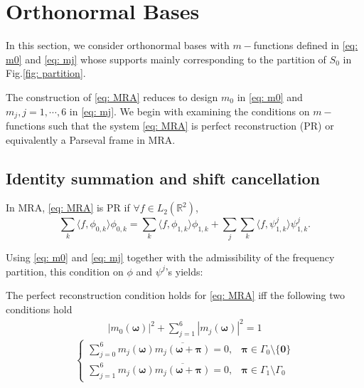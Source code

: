 \section{Orthonormal Bases}\label{sec: orth}

In this section, we consider orthonormal bases with $m-$functions defined in \eqref{eq: m0} and \eqref{eq: mj} whose supports mainly corresponding to the partition of $S_0$ in Fig.\ref{fig: partition}.

The construction of \eqref{eq: MRA} reduces to design $m_0$ in \eqref{eq: m0} and $m_j, j= 1,\cdots,6$ in \eqref{eq: mj}.
We begin with examining the conditions on $m-$functions such that the system \eqref{eq: MRA} is perfect reconstruction (PR) or equivalently a Parseval frame in MRA.%

\subsection{Identity summation and shift cancellation}

In MRA, \eqref{eq: MRA} is PR if $\forall f\in L_2(\mathbb{R}^2)$,
\begin{equation}
\textstyle \sum_k\langle f,\phi_{0,k}\rangle\phi_{0,k} = \sum_k\langle f,\phi_{1,k}\rangle\phi_{1,k} + \sum_j\sum_k\langle f,\psi^{j}_{1,k}\rangle\psi^j_{1,k}.\label{eq: PR}
\end{equation}

Using \eqref{eq: m0} and \eqref{eq: mj} together with the admissibility of the frequency partition, this condition on $\phi$ and $\psi^j$'s yields:
\begin{thm}\label{thm: conds}
The perfect reconstruction condition holds for \eqref{eq: MRA} iff the following two conditions hold
\begin{align}\label{eq: id-sum}
|m_0(\boldsymbol{\omega})|^2 + \sum_{j = 1}^6|m_j(\boldsymbol{\omega})|^2 = 1
\end{align}
\begin{equation}\label{eq: shift-cancel}
 \begin{cases}
\sum_{j = 0}^6m_j(\boldsymbol{\omega})\overline{m_j(\boldsymbol{\omega} + \boldsymbol{\pi})} = 0, & \boldsymbol{\pi}\in \Gamma_0\setminus\{\boldsymbol{0}\}\\[.5em]
\sum_{j=1}^6m_j(\boldsymbol{\omega})\overline{m_j(\boldsymbol{\omega}+\boldsymbol{\pi})} = 0, & \boldsymbol{\pi}\in\Gamma_1\setminus\Gamma_0
\end{cases}
\end{equation}
\end{thm}

